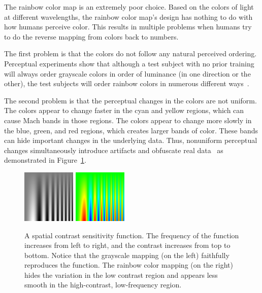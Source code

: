 \documentclass[review,journal]{vgtc}         %
\newcommand{\lcite}[1]{~\cite{#1}}
\begin{document}
The rainbow color map is an
extremely poor choice.  Based on the colors of light at different
wavelengths, the rainbow color map's design has nothing to do with how
humans perceive color.  This results in multiple problems when humans try
to do the reverse mapping from colors back to numbers.

The first problem is that the colors do not follow any natural perceived
ordering.  Perceptual experiments show that although a test subject with no
prior training will always order grayscale colors in order of luminance (in
one direction or the other), the test subjects will order rainbow colors in
numerous different ways\lcite{Ware04}.

The second problem is that the perceptual changes in the colors are not
uniform.  The colors appear to change faster in the cyan and yellow
regions, which can cause Mach bands in those regions.  The colors appear to
change more slowly in the blue, green, and red regions, which creates larger
bands of color.  These bands can hide important changes in the
underlying data.  Thus, nonuniform perceptual changes
simultaneously introduce artifacts and obfuscate real
data\lcite{Borland07} as demonstrated in
Figure~\ref{fig:RainbowSpatialContrast}.

\begin{figure}
  \centering
  \includegraphics[width=1.0in]{images/GrayscaleSpatialContrast}
  \qquad
  \includegraphics[width=1.0in]{images/RainbowSpatialContrast}
  \caption{A spatial contrast sensitivity function.  The frequency of the
    function increases from left to right, and the contrast increases from
    top to bottom.  Notice that the grayscale mapping (on the left)
    faithfully reproduces the function.  The rainbow color mapping (on the
    right) hides the variation in the low contrast region and appears less
    smooth in the high-contrast, low-frequency region.}
  \label{fig:RainbowSpatialContrast}
\end{figure}
\end{document}
